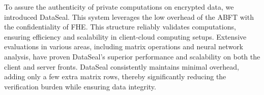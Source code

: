 To assure the authenticity of private computations on encrypted data, we introduced DataSeal. This system leverages the low overhead of the ABFT with the confidentiality of FHE. This structure reliably validates computations, ensuring efficiency and scalability in client-cloud computing setups. Extensive evaluations in various areas, including matrix operations and neural network analysis, have proven DataSeal's superior performance and scalability on both the client and server fronts. DataSeal consistently maintains minimal overhead, adding only a few extra matrix rows, thereby significantly reducing the verification burden while ensuring data integrity.